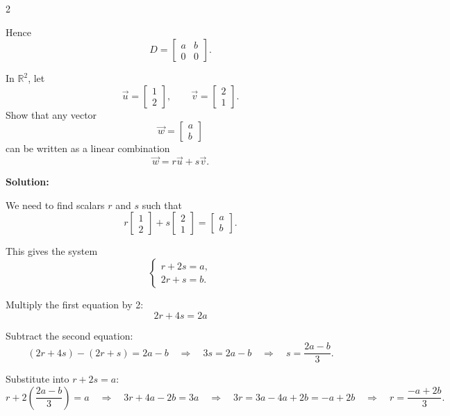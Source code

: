 \documentclass[8pt]{extarticle}
\begin{document}
\begin{multicols}{2}
\begin{tcolorbox}[title=Problem 10(b) — Original Statement and Solution]
Hence
\[
D =
\begin{bmatrix}
a & b\\
0 & 0
\end{bmatrix}.
\]
\end{tcolorbox}

\begin{tcolorbox}[title=Problem 11 — Original Statement and Solution]
\noindent
In \(\mathbb{R}^{2}\), let
\[
\vec{u} = 
\begin{bmatrix}
1\\ 2
\end{bmatrix},
\qquad
\vec{v} =
\begin{bmatrix}
2\\ 1
\end{bmatrix}.
\]
Show that any vector
\[
\vec{w} =
\begin{bmatrix}
a\\ b
\end{bmatrix}
\]
can be written as a linear combination
\[
\vec{w} = r\vec{u} + s\vec{v}.
\]

\bigskip
\noindent
\textbf{Solution:}

We need to find scalars \(r\) and \(s\) such that
\[
r\begin{bmatrix}1\\2\end{bmatrix}
+ s\begin{bmatrix}2\\1\end{bmatrix}
= \begin{bmatrix}a\\b\end{bmatrix}.
\]

This gives the system
\[
\begin{cases}
r + 2s = a,\\
2r + s = b.
\end{cases}
\]

Multiply the first equation by 2:
\[
2r + 4s = 2a
\]

Subtract the second equation:
\[
(2r + 4s) - (2r + s) = 2a - b
\quad\Rightarrow\quad
3s = 2a - b
\quad\Rightarrow\quad
s = \frac{2a - b}{3}.
\]

Substitute into \(r + 2s = a\):
\[
r + 2\left(\frac{2a - b}{3}\right) = a
\quad\Rightarrow\quad
3r + 4a - 2b = 3a
\quad\Rightarrow\quad
3r = 3a - 4a + 2b = -a + 2b
\quad\Rightarrow\quad
r = \frac{-a + 2b}{3}.
\]


\end{tcolorbox}
\end{multicols}
\end{document}

